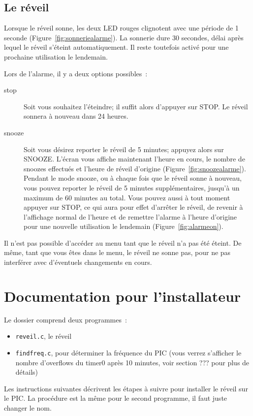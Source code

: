 \documentclass[12pt,a4paper]{article}
\begin{document}
\subsection{Le réveil}
Lorsque le réveil sonne, les deux LED rouges clignotent avec une période de 1 seconde (Figure~\ref{fig:sonneriealarme}). La sonnerie dure 30 secondes, délai après lequel le réveil s'éteint automatiquement. Il reste toutefois activé pour une prochaine utilisation le lendemain.

Lors de l'alarme, il y a deux options possibles~:
\begin{description}
\item[stop] Soit vous souhaitez l'éteindre; il suffit alors d'appuyer sur STOP. Le réveil sonnera à nouveau dans 24 heures.
\item[snooze] Soit vous désirez reporter le réveil de 5 minutes; appuyez alors sur SNOOZE. L'écran vous affiche maintenant l'heure en cours, le nombre de snoozes effectués et l'heure de réveil d'origine (Figure~\ref{fig:snoozealarme}). Pendant le mode snooze, ou à chaque fois que le réveil sonne à nouveau, vous pouvez reporter le réveil de 5 minutes supplémentaires, jusqu'à un maximum de 60 minutes au total. Vous pouvez aussi à tout moment appuyer sur STOP, ce qui aura pour effet d'arrêter le réveil, de revenir à l'affichage normal de l'heure et de remettre l'alarme à l'heure d'origine pour une nouvelle utilisation le lendemain (Figure~\ref{fig:alarmeon}).
\end{description}

Il n'est pas possible d'accéder au menu tant que le réveil n'a pas été éteint. De même, tant que vous êtes dans le menu, le réveil ne sonne pas, pour ne pas interférer avec d'éventuels changements en cours.

\section{Documentation pour l'installateur}
Le dossier comprend deux programmes~:
\begin{itemize}
\item \texttt{reveil.c}, le réveil %
\item \texttt{findfreq.c}, pour déterminer la fréquence du PIC (vous verrez s'afficher le nombre d'overflows du timer0 après 10 minutes, voir section ??? pour plus de détails)
\end{itemize}
Les instructions suivantes décrivent les étapes à suivre pour installer le réveil sur le PIC. La procédure est la même pour le second programme, il faut juste changer le nom.
\end{document}
